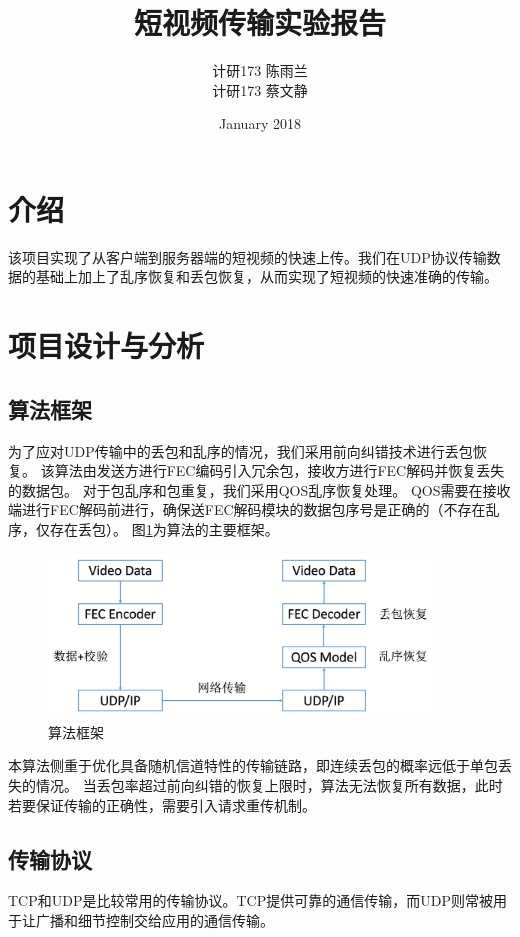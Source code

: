 \documentclass[onecolumn]{article}
\title{短视频传输实验报告}
\author{计研173 \quad 陈雨兰 \quad 2017310787  \\ 计研173 \quad 蔡文静 \quad 2017210866}
\date{January 2018}
\begin{document}
	\begin{CJK*}{UTF8}{gbsn}
		
		\maketitle
\section{介绍}
		该项目实现了从客户端到服务器端的短视频的快速上传。我们在UDP协议传输数据的基础上加上了乱序恢复和丢包恢复，从而实现了短视频的快速准确的传输。
		
\section{项目设计与分析}
		\subsection{算法框架}
		为了应对UDP传输中的丢包和乱序的情况，我们采用前向纠错技术进行丢包恢复。
		该算法由发送方进行FEC编码引入冗余包，接收方进行FEC解码并恢复丢失的数据包。
		对于包乱序和包重复，我们采用QOS乱序恢复处理。
		QOS需要在接收端进行FEC解码前进行，确保送FEC解码模块的数据包序号是正确的（不存在乱序，仅存在丢包）。
		图\ref{fig:frame}为算法的主要框架。
		
		\begin{figure}[h]
			\centering
			\includegraphics[width=4in]{frame.jpg}
			\caption{算法框架}
			\label{fig:frame}
		\end{figure}
		
		本算法侧重于优化具备随机信道特性的传输链路，即连续丢包的概率远低于单包丢失的情况。
		当丢包率超过前向纠错的恢复上限时，算法无法恢复所有数据，此时若要保证传输的正确性，需要引入请求重传机制。
		
		\subsection{传输协议}
		TCP和UDP是比较常用的传输协议。TCP提供可靠的通信传输，而UDP则常被用于让广播和细节控制交给应用的通信传输。

\end{CJK*}
\end{document}
